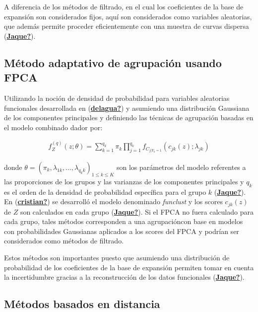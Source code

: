 \documentclass[
]{book}
\begin{document}
A diferencia de los métodos de filtrado, en el cual los coeficientes de la base de expansión son considerados fijos, aquí son considerados como variables aleatorias, que además permite proceder eficientemente con una muestra de curvas dispersa (\protect\hyperlink{ref-Jaque}{\textbf{Jaque?}}).

\hypertarget{muxe9todo-adaptativo-de-agrupaciuxf3n-usando-fpca}{%
\subsection{Método adaptativo de agrupación usando FPCA}\label{muxe9todo-adaptativo-de-agrupaciuxf3n-usando-fpca}}

Utilizando la noción de densidad de probabilidad para variables aleatorias funcionales desarrollada en (\protect\hyperlink{ref-delagua}{\textbf{delagua?}}) y asumiendo una distribución Gaussiana de los componentes principales y definiendo las técnicas de agrupación basadas en el modelo combinado dador por:

\begin{align*}
    f_Z^{(q)}(z;\theta)=\sum_{k=1}^{q_k} \pi_k\prod_{j=1}^{q_k} f_{C_{j{|Y_k=1}}}(c_{jk}(z);\lambda_{jk})
\end{align*}

donde \(\theta=(\pi_{k},\lambda_{1k},...,\lambda_{q_{k}k})_{1\leq k \leq K}\) son los parámetros del modelo referentes a las proporciones de los grupos y las varianzas de los componentes principales y \(q_k\) es el orden de la densidad de probabilidad específica para el grupo \(k\) (\protect\hyperlink{ref-Jaque}{\textbf{Jaque?}}). En (\protect\hyperlink{ref-cristian}{\textbf{cristian?}}) se desarrolló el modelo denominado \emph{funclust} y los scores \(c_{jk}(z)\) de \(Z\) son calculados en cada grupo (\protect\hyperlink{ref-Jaque}{\textbf{Jaque?}}). Si el FPCA no fuera calculado para cada grupo, tales métodos corresponden a una agrupacióncon base en modelos con probabilidades Gaussianas aplicados a los scores del FPCA y podrían ser considerados como métodos de filtrado.

Estos métodos son importantes puesto que asumiendo una distribución de probabilidad de los coeficientes de la base de expansión permiten tomar en cuenta la incertidumbre gracias a la reconstrucción de los datos funcionales (\protect\hyperlink{ref-Jaque}{\textbf{Jaque?}}).

\hypertarget{muxe9todos-basados-en-distancia}{%
\subsection{Métodos basados en distancia}\label{muxe9todos-basados-en-distancia}}
\end{document}
